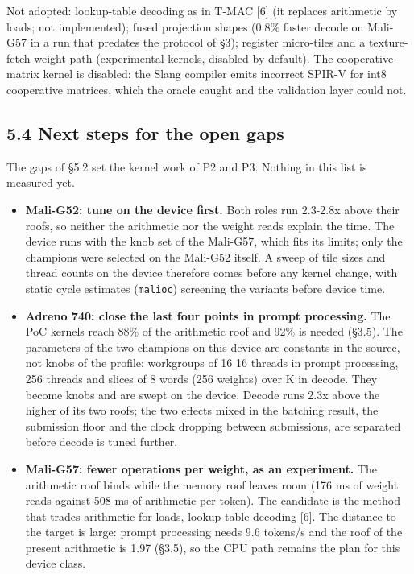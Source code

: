 \documentclass[
  10pt,
]{article}
\providecommand{\tightlist}{%
  \setlength{\itemsep}{0pt}\setlength{\parskip}{0pt}}
\begin{document}
Not adopted: lookup-table decoding as in T-MAC [6] (it replaces
arithmetic by loads; not implemented); fused projection shapes (0.8\%
faster decode on Mali-G57 in a run that predates the protocol of \S{}3);
register micro-tiles and a texture-fetch weight path (experimental
kernels, disabled by default). The cooperative-matrix kernel is
disabled: the Slang compiler emits incorrect SPIR-V for int8 cooperative
matrices, which the oracle caught and the validation layer could not.

\subsection{5.4 Next steps for the open gaps}\label{next-steps-for-the-open-gaps}

The gaps of \S{}5.2 set the kernel work of P2 and P3. Nothing in this
list is measured yet.

\begin{itemize}
\tightlist%
\item
  \textbf{Mali-G52: tune on the device first.} Both roles run 2.3-2.8x
  above their roofs, so neither the arithmetic nor the weight reads
  explain the time. The device runs with the knob set of the Mali-G57,
  which fits its limits; only the champions were selected on the
  Mali-G52 itself. A sweep of tile sizes and thread counts on the device
  therefore comes before any kernel change, with static cycle estimates
  (\texttt{malioc}) screening the variants before device time.
\item
  \textbf{Adreno 740: close the last four points in prompt processing.}
  The PoC kernels reach 88\% of the arithmetic roof and 92\% is needed
  (\S{}3.5). The parameters of the two champions on this device are
  constants in the source, not knobs of the profile: workgroups of 16
  \texttimes{} 16 threads in prompt processing, 256 threads and slices
  of 8 words (256 weights) over K in decode. They become knobs and are
  swept on the device. Decode runs 2.3x above the higher of its two
  roofs; the two effects mixed in the batching result, the submission
  floor and the clock dropping between submissions, are separated before
  decode is tuned further.
\item
  \textbf{Mali-G57: fewer operations per weight, as an experiment.} The
  arithmetic roof binds while the memory roof leaves room (176 ms of
  weight reads against 508 ms of arithmetic per token). The candidate is
  the method that trades arithmetic for loads, lookup-table decoding
  [6]. The distance to the target is large: prompt processing needs 9.6
  tokens/s and the roof of the present arithmetic is 1.97 (\S{}3.5), so
  the CPU path remains the plan for this device class.
\end{itemize}
\end{document}

